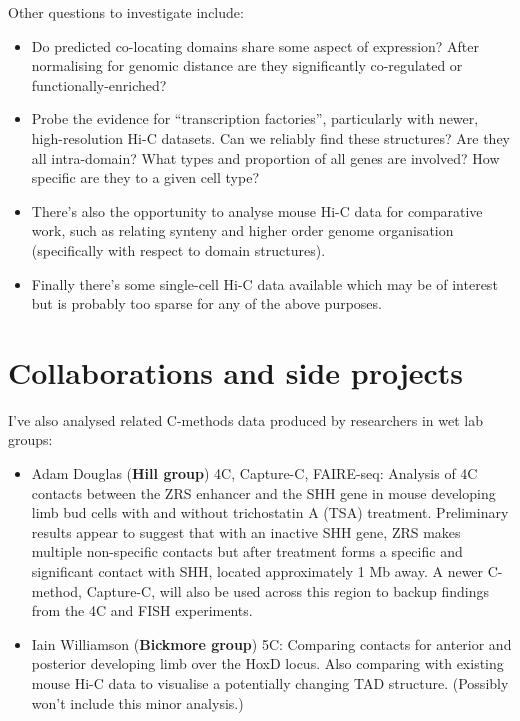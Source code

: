 \documentclass[a4paper,10pt,oneside]{book}
\begin{document}
Other questions to investigate include:
\begin{itemize}
\item Do predicted co-locating domains share some aspect of
  expression? After normalising for genomic distance are they
  significantly co-regulated or functionally-enriched?
\item Probe the evidence for ``transcription factories'', particularly
  with newer, high-resolution Hi-C datasets. Can we reliably find
  these structures? Are they all intra-domain? What types and
  proportion of all genes are involved? How specific are they to a
  given cell type?
\item There's also the opportunity to analyse mouse Hi-C data for
  comparative work, such as relating synteny and higher order genome
  organisation (specifically with respect to domain structures).
\item Finally there's some single-cell Hi-C data available which may
  be of interest but is probably too sparse for any of the above
  purposes.
\end{itemize}

\section{Collaborations and side
projects}\label{collaborations-and-side-projects}

I've also analysed related C-methods data produced by researchers in wet
lab groups:

\begin{itemize}
\item Adam Douglas (\textbf{Hill group}) 4C, Capture-C, FAIRE-seq: Analysis of 4C
  contacts between the ZRS enhancer and the SHH gene in mouse
  developing limb bud cells with and without trichostatin A (TSA)
  treatment. Preliminary results appear to suggest that with an
  inactive SHH gene, ZRS makes multiple non-specific contacts but
  after treatment forms a specific and significant contact with SHH,
  located approximately 1 Mb away. A newer C-method, Capture-C, will
  also be used across this region to backup findings from the 4C and
  FISH experiments.
\item Iain Williamson (\textbf{Bickmore group}) 5C: Comparing contacts for
  anterior and posterior developing limb over the HoxD locus. Also
  comparing with existing mouse Hi-C data to visualise a potentially
  changing TAD structure. (Possibly won't include this minor analysis.)
\end{itemize}
\end{document}
